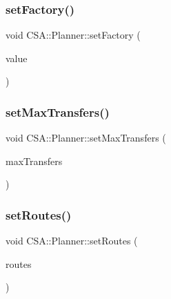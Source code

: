 \mbox{\label{classCSA_1_1Planner_a6f6fe97b8620230960514f544109f076}} 
\subsubsection{\texorpdfstring{set\+Factory()}{setFactory()}}
{\footnotesize\ttfamily void C\+S\+A\+::\+Planner\+::set\+Factory (\begin{DoxyParamCaption}\item[{\mbox{\hyperlink{classFragments_1_1Factory}{Fragments\+::\+Factory}} $\ast$}]{value }\end{DoxyParamCaption})\hspace{0.3cm}{\ttfamily [private]}}

\mbox{\label{classCSA_1_1Planner_a950c1dc8208d98aab977f490c2e7b244}} 
\subsubsection{\texorpdfstring{set\+Max\+Transfers()}{setMaxTransfers()}}
{\footnotesize\ttfamily void C\+S\+A\+::\+Planner\+::set\+Max\+Transfers (\begin{DoxyParamCaption}\item[{const qint16 \&}]{max\+Transfers }\end{DoxyParamCaption})}

\mbox{\label{classCSA_1_1Planner_a596d6e4038e76ff4944cab418594858f}} 
\subsubsection{\texorpdfstring{set\+Routes()}{setRoutes()}}
{\footnotesize\ttfamily void C\+S\+A\+::\+Planner\+::set\+Routes (\begin{DoxyParamCaption}\item[{const Q\+List$<$ \mbox{\hyperlink{classCSA_1_1Route}{C\+S\+A\+::\+Route}} $\ast$$>$ \&}]{routes }\end{DoxyParamCaption})\hspace{0.3cm}{\ttfamily [private]}}

